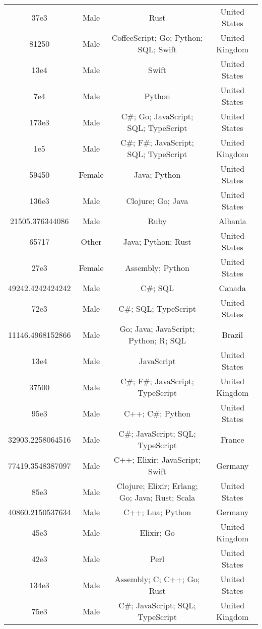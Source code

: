 \begin{center}
\begin{tabular}{ |c|c|c|c| }
37e3  &  Male  &  Rust  &  United States  \\ 
81250  &  Male  &  CoffeeScript; Go; Python; SQL; Swift  &  United Kingdom  \\ 
13e4  &  Male  &  Swift  &  United States  \\ 
7e4  &  Male  &  Python  &  United States  \\ 
173e3  &  Male  &  C\#; Go; JavaScript; SQL; TypeScript  &  United States  \\ 
1e5  &  Male  &  C\#; F\#; JavaScript; SQL; TypeScript  &  United Kingdom  \\ 
59450  &  Female  &  Java; Python  &  United States  \\ 
136e3  &  Male  &  Clojure; Go; Java  &  United States  \\ 
21505.376344086  &  Male  &  Ruby  &  Albania  \\ 
65717  &  Other  &  Java; Python; Rust  &  United States  \\ 
27e3  &  Female  &  Assembly; Python  &  United States  \\ 
49242.4242424242  &  Male  &  C\#; SQL  &  Canada  \\ 
72e3  &  Male  &  C\#; SQL; TypeScript  &  United States  \\ 
11146.4968152866  &  Male  &  Go; Java; JavaScript; Python; R; SQL  &  Brazil  \\ 
13e4  &  Male  &  JavaScript  &  United States  \\ 
37500  &  Male  &  C\#; F\#; JavaScript; TypeScript  &  United Kingdom  \\ 
95e3  &  Male  &  C++; C\#; Python  &  United States  \\ 
32903.2258064516  &  Male  &  C\#; JavaScript; SQL; TypeScript  &  France  \\ 
77419.3548387097  &  Male  &  C++; Elixir; JavaScript; Swift  &  Germany  \\ 
85e3  &  Male  &  Clojure; Elixir; Erlang; Go; Java; Rust; Scala  &  United States  \\ 
40860.2150537634  &  Male  &  C++; Lua; Python  &  Germany  \\ 
45e3  &  Male  &  Elixir; Go  &  United Kingdom  \\ 
42e3  &  Male  &  Perl  &  United States  \\ 
134e3  &  Male  &  Assembly; C; C++; Go; Rust  &  United States  \\ 
75e3  &  Male  &  C\#; JavaScript; SQL; TypeScript  &  United Kingdom  \\ 

\end{tabular}
\end{center}
